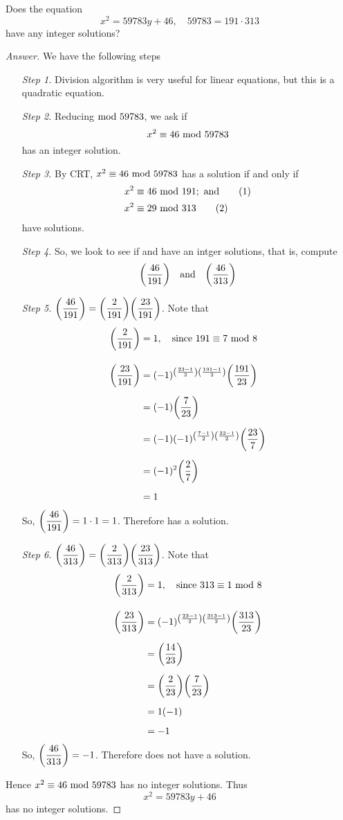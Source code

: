 
\begin{example}
Does the equation
\[x^2 = 59783y + 46,\quad 59783 = 191\cdot 313\]
have any integer solutions?
\end{example}
\begin{proof}[Answer]
We have the following steps
\begin{itemize}[leftmargin=3.3em,itemsep=2em]
\item[\emph{Step 1.}] Division algorithm is very useful for linear equations, but this is a quadratic equation.
\item[\emph{Step 2.}] Reducing$\text{ mod }{59783}$, we ask if 
\[x^2 \equiv 46\text{ mod }{59783}\]
has an integer solution.
\item[\emph{Step 3.}] By CRT, $x^2 \equiv 46\text{ mod }{59783}$ has a solution if and only if
\begin{align*}[left=\empheqlbrace]
x^2 &\equiv 46\modar{191};\ \text{and}\label{eqc1}\tag{$1$}\\[0.1em]
x^2 &\equiv 29\modar{313}\label{eqc2}\tag{$2$}
\end{align*}
have solutions.
\item[\emph{Step 4.}] So, we look to see if  and  have an intger solutions, that is, compute
\[\bigg(\dfrac{46}{191}\bigg)\quad \text{and}\quad \bigg(\dfrac{46}{313}\bigg)\]
\item[\emph{Step 5.}] $\displaystyle \bigg(\dfrac{46}{191}\bigg) = \bigg(\dfrac{2}{191}\bigg)\bigg(\dfrac{23}{191}\bigg)$. Note that
\begin{align*}
\bigg(\dfrac{2}{191}\bigg) &= 1,\quad \text{since }191 \equiv 7\text{ mod }{8}\\[1em]
\bigg(\dfrac{23}{191}\bigg) &= (-1)^{\left(\frac{23-1}{2}\right)\left(\frac{191-1}{2}\right)}\bigg(\dfrac{191}{23}\bigg)\\[0.5em]
&= (-1)\bigg(\dfrac{7}{23}\bigg)\\[0.5em]
&= (-1)(-1)^{\left(\frac{7-1}{2}\right)\left(\frac{23-1}{2}\right)}\bigg(\dfrac{23}{7}\bigg)\\[0.5em]
&= (-1)^2\bigg(\dfrac{2}{7}\bigg)\\[0.5em]
&= 1
\end{align*}
So, $\bigg(\dfrac{46}{191}\bigg) = 1\cdot 1 = 1$. Therefore  has a solution.
\item[\emph{Step 6.}] $\displaystyle \bigg(\dfrac{46}{313}\bigg) = \bigg(\dfrac{2}{313}\bigg)\bigg(\dfrac{23}{313}\bigg)$. Note that
\begin{align*}
\bigg(\dfrac{2}{313}\bigg) &= 1,\quad \text{since }313 \equiv 1\text{ mod }{8}\\[1em]
\bigg(\dfrac{23}{313}\bigg) &= (-1)^{\left(\frac{23-1}{2}\right)\left(\frac{313-1}{2}\right)}\bigg(\dfrac{313}{23}\bigg)\\[0.5em]
&= \bigg(\dfrac{14}{23}\bigg)\\[0.5em]
&= \bigg(\dfrac{2}{23}\bigg)\bigg(\dfrac{7}{23}\bigg)\\[0.5em]
&= 1(-1)\\[0.5em]
&= -1
\end{align*}
So, $\bigg(\dfrac{46}{313}\bigg) = -1$. Therefore  does not have a solution.
\end{itemize}
\vspace*{0.2in}
Hence $x^2 \equiv 46 \text{ mod }{59783}$ has no integer solutions. Thus
\[x^2 = 59783y + 46\]
has no integer solutions.
\end{proof}

